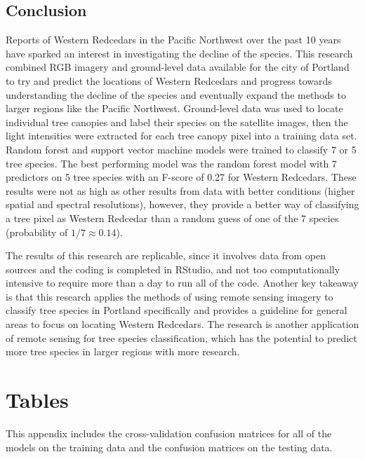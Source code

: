 \documentclass[12pt,twoside]{reedthesis}
\begin{document}
\hypertarget{conclusion}{%
\section{Conclusion}\label{conclusion}}

Reports of Western Redcedars in the Pacific Northwest over the past 10 years have sparked an interest in investigating the decline of the species. This research combined RGB imagery and ground-level data available for the city of Portland to try and predict the locations of Western Redcedars and progress towards understanding the decline of the species and eventually expand the methods to larger regions like the Pacific Northwest. Ground-level data was used to locate individual tree canopies and label their species on the satellite images, then the light intensities were extracted for each tree canopy pixel into a training data set. Random forest and support vector machine models were trained to classify 7 or 5 tree species. The best performing model was the random forest model with 7 predictors on 5 tree species with an F-score of 0.27 for Western Redcedars. These results were not as high as other results from data with better conditions (higher spatial and spectral resolutions), however, they provide a better way of classifying a tree pixel as Western Redcedar than a random guess of one of the 7 species (probability of \(1/7 \approx 0.14\)).

The results of this research are replicable, since it involves data from open sources and the coding is completed in RStudio, and not too computationally intensive to require more than a day to run all of the code. Another key takeaway is that this research applies the methods of using remote sensing imagery to classify tree species in Portland specifically and provides a guideline for general areas to focus on locating Western Redcedars. The research is another application of remote sensing for tree species classification, which has the potential to predict more tree species in larger regions with more research.

\appendix

\hypertarget{tables}{%
\chapter{Tables}\label{tables}}

This appendix includes the cross-validation confusion matrices for all of the models on the training data and the confusion matrices on the testing data.
\end{document}
